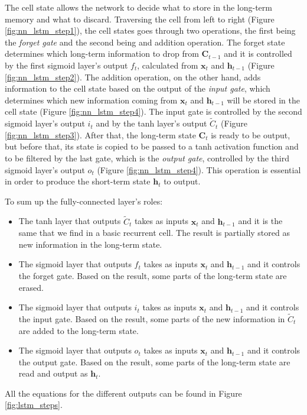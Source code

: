 The cell state allows the network to decide what to store in the long-term memory and what to discard. Traversing the cell from left to right (Figure \ref{fig:nn_lstm_step1}), the cell states goes through two operations, the first being the \textit{forget gate} and the second being and addition operation. The forget state determines which long-term information to drop from $\mathbf{C}_{t-1}$ and it is controlled by the first sigmoid layer's output $f_t$, calculated from $\mathbf{x}_t$ and $\mathbf{h}_{t-1}$ (Figure \ref{fig:nn_lstm_step2}). The addition operation, on the other hand, adds information to the cell state based on the output of the \textit{input gate}, which determines which new information coming from $\mathbf{x}_t$ and $\mathbf{h}_{t-1}$ will be stored in the cell state (Figure \ref{fig:nn_lstm_step4}). The input gate is controlled by the second sigmoid layer's output $i_t$ and by the \acs{tanh} layer's output $\tilde{C}_t$ (Figure \ref{fig:nn_lstm_step3}). After that, the long-term state $\mathbf{C}_t$ is ready to be output, but before that, its state is copied to be passed to a \acs{tanh} activation function and to be filtered by the last gate, which is the \textit{output gate}, controlled by the third sigmoid layer's output $o_t$ (Figure \ref{fig:nn_lstm_step4}). This operation is essential in order to produce the short-term state $\mathbf{h}_t$ to output.

To sum up the fully-connected layer's roles:
\begin{itemize}
    \item The \acs{tanh} layer that outputs $\tilde{C}_t$ takes as inputs $\mathbf{x}_t$ and $\mathbf{h}_{t-1}$ and it is the same that we find in a basic recurrent cell. The result is partially stored as new information in the long-term state.
    \item The sigmoid layer that outputs $f_t$ takes as inputs $\mathbf{x}_t$ and $\mathbf{h}_{t-1}$ and it controls the forget gate. Based on the result, some parts of the long-term state are erased.
    \item The sigmoid layer that outputs $i_t$ takes as inputs $\mathbf{x}_t$ and $\mathbf{h}_{t-1}$ and it controls the input gate. Based on the result, some parts of the new information in $\tilde{C}_t$ are added to the long-term state.
    \item The sigmoid layer that outputs $o_t$ takes as inputs $\mathbf{x}_t$ and $\mathbf{h}_{t-1}$ and it controls the output gate. Based on the result, some parts of the long-term state are read and output as $\mathbf{h}_t$.
\end{itemize}
All the equations for the different outputs can be found in Figure \ref{fig:lstm_steps}.

